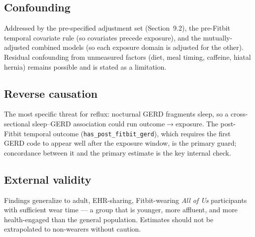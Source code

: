 \documentclass[11pt]{article}
\newcommand{\code}[1]{\texttt{\small #1}}
\begin{document}
\subsection{Confounding}
Addressed by the pre-specified adjustment set (Section~9.2), the pre-Fitbit temporal covariate rule
(so covariates precede exposure), and the mutually-adjusted combined models (so each exposure domain is
adjusted for the other). Residual confounding from unmeasured factors (diet, meal timing, caffeine,
hiatal hernia) remains possible and is stated as a limitation.

\subsection{Reverse causation}
The most specific threat for reflux: nocturnal GERD fragments sleep, so a cross-sectional
sleep--GERD association could run outcome$\rightarrow$exposure. The post-Fitbit temporal outcome
(\code{has_post_fitbit_gerd}), which requires the first GERD code to appear well after the exposure
window, is the primary guard; concordance between it and the primary estimate is the key internal check.

\subsection{External validity}
Findings generalize to adult, EHR-sharing, Fitbit-wearing \emph{All of Us} participants with sufficient
wear time --- a group that is younger, more affluent, and more health-engaged than the general
population. Estimates should not be extrapolated to non-wearers without caution.

\end{document}
